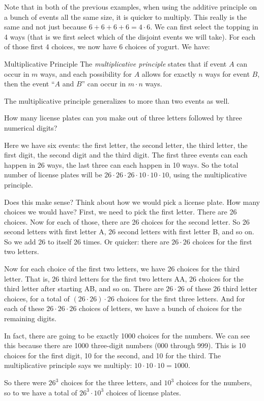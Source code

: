 \documentclass[12pt]{article}
\begin{document}
Note that in both of the previous examples, when using the additive principle on a bunch of events all the same size, it is quicker to multiply.  This really is the same and not just because $6 + 6 + 6 + 6 = 4\cdot 6$.  We can first select the topping in 4 ways (that is we first select which of the disjoint events we will take).  For each of those first 4 choices, we now have 6 choices of yogurt.  We have:

\begin{defbox}{Multiplicative Principle}
  The {\em multiplicative principle} states that if event $A$ can occur in $m$ ways, and each possibility for $A$ allows for exactly $n$ ways for event $B$, then the event ``$A$ and $B$'' can occur in $m \cdot n$ ways.
\end{defbox}

The multiplicative principle generalizes to more than two events as well.

\begin{example}
  How many license plates can you make out of three letters followed by three numerical digits?
  
  \begin{solution}
    Here we have six events: the first letter, the second letter, the third letter, the first digit, the second digit and the third digit.  The first three events can each happen in 26 ways, the last three can each happen in 10 ways.  So the total number of license plates will be $26\cdot 26\cdot 26 \cdot 10 \cdot 10 \cdot 10$, using the multiplicative principle.
    
    Does this make sense?  Think about how we would pick a license plate. How many choices we would have?  First, we need to pick the first letter.  There are 26 choices.  Now for each of those, there are 26 choices for the second letter.  So 26 second letters with first letter A, 26 second letters with first letter B, and so on.  So we add 26 to itself 26 times.  Or quicker: there are $26 \cdot 26$ choices for the first two letters.  
    
    Now for each choice of the first two letters, we have 26 choices for the third letter.  That is, 26 third letters for the first two letters AA, 26 choices for the third letter after starting AB, and so on.  There are $26 \cdot 26$ of these $26$ third letter choices, for a total of $(26\cdot26)\cdot 26$ choices for the first three letters.  And for each of these $26\cdot26\cdot26$ choices of letters, we have a bunch of choices for the remaining digits.
    
    In fact, there are going to be exactly 1000 choices for the numbers.  We can see this because there are 1000 three-digit numbers (000 through 999).  This is 10 choices for the first digit, 10 for the second, and 10 for the third.  The multiplicative principle says we multiply: $10\cdot 10 \cdot 10 = 1000$.  
    
    So there were $26^3$ choices for the three letters, and $10^3$ choices for the numbers, so to we have a total of $26^3 \cdot 10^3$ choices of license plates.
  \end{solution}

\end{example}
\end{document}
